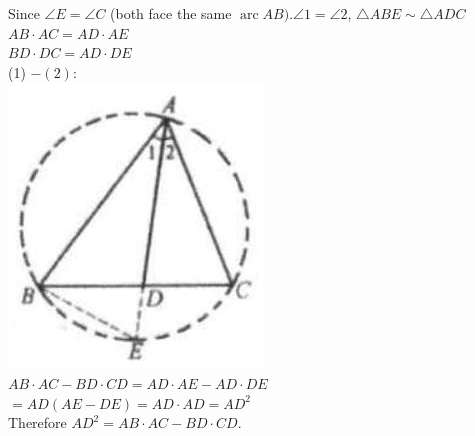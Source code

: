 \documentclass{article}
\begin{document}
Since \(\angle E=\angle C\) (both face the same \(\operatorname{arc} A B) . \angle 1=\angle 2\), \(\triangle A B E \sim \triangle A D C\)\\
\(A B \cdot A C=A D \cdot A E\)\\
\(B D \cdot D C=A D \cdot D E\)\\
(1) \(-(2):\)\\
\centering
\includegraphics[width=\textwidth]{images/reasoning_image_1.jpg}\\
\(A B \cdot A C-B D \cdot C D=A D \cdot A E-A D \cdot D E\)\\
\(=A D(A E-D E)=A D \cdot A D=A D^{2}\)\\
Therefore \(A D^{2}=A B \cdot A C-B D \cdot C D\).
\end{document}
